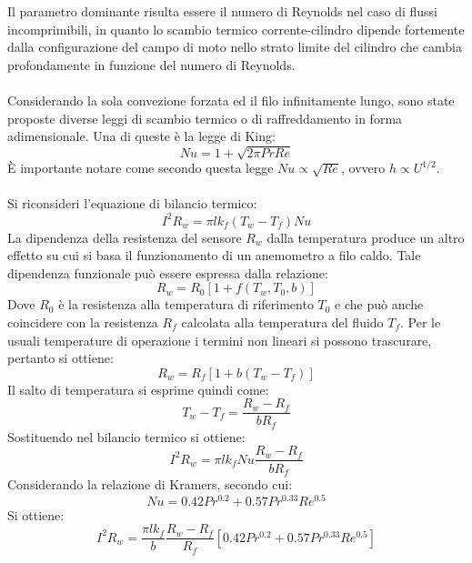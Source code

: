 Il parametro dominante risulta essere il numero di Reynolds nel caso di flussi incomprimibili, in quanto lo scambio termico corrente-cilindro dipende fortemente dalla configurazione del campo di moto nello strato limite del cilindro che cambia profondamente in funzione del numero di Reynolds.\\\\
Considerando la sola convezione forzata ed il filo infinitamente lungo, sono state proposte diverse leggi di scambio termico o di raffreddamento in forma adimensionale. Una di queste è la legge di King:
\begin{equation*}
    Nu = 1 +\sqrt{2\pi Pr Re}
\end{equation*}
È importante notare come secondo questa legge $Nu\propto \sqrt{Re}$, ovvero $h\propto U^{1/2}$.\\\\
Si riconsideri l'equazione di bilancio termico:
\begin{equation*}
    I^2 R_w = \pi l k_f (T_w - T_f) Nu
\end{equation*}
La dipendenza della resistenza del sensore $R_w$ dalla temperatura produce un altro effetto su cui si basa il funzionamento di un anemometro a filo caldo. Tale dipendenza funzionale può essere espressa dalla relazione:
\begin{equation*}
    R_w = R_0 [1 + f(T_w, T_0, b)]
\end{equation*}
Dove $R_0$ è la resistenza alla temperatura di riferimento $T_0$ e che può anche coincidere con la resistenza $R_f$ calcolata alla temperatura del fluido $T_f$. Per le usuali temperature di operazione i termini non lineari si possono trascurare, pertanto si ottiene:
\begin{equation*}
    R_w = R_f[1+b(T_w-T_f)]
\end{equation*}
Il salto di temperatura si esprime quindi come:
\begin{equation*}
    T_w - T_f = \frac{R_w - R_f}{bR_f}
\end{equation*}
Sostituendo nel bilancio termico si ottiene:
\begin{equation*}
    I^2 R_w = \pi l k_f Nu \frac{R_w - R_f}{bR_f}
\end{equation*}
Considerando la relazione di Kramers, secondo cui:
\begin{equation*}
    Nu = 0.42 Pr^{0.2} + 0.57 Pr^{0.33} Re^{0.5}
\end{equation*}
Si ottiene:
\begin{equation*}
    I^2R_w = \frac{\pi l k_f}b \frac{R_w - R_f}{R_f} [0.42 Pr^{0.2} + 0.57 Pr^{0.33} Re^{0.5}]
\end{equation*}

